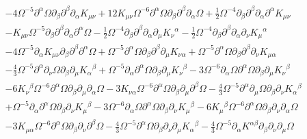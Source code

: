 \documentclass[aps]{revtex4}
\begin{document}
\begin{align}
\nonumber\\
&- 4 \Omega^{-5} \partial^{\alpha}\Omega \partial_{\beta}\partial^{\beta}\partial_{\alpha}K_{\mu \nu} + 12 K_{\mu \nu} \Omega^{-6} \partial^{\alpha}\Omega \partial_{\beta}\partial^{\beta}\partial_{\alpha}\Omega + \tfrac{1}{2} \Omega^{-4} \partial_{\beta}\partial^{\beta}\partial_{\alpha}\partial^{\alpha}K_{\mu \nu}
\nonumber\\
& -  K_{\mu \nu} \Omega^{-5} \partial_{\beta}\partial^{\beta}\partial_{\alpha}\partial^{\alpha}\Omega -  \tfrac{1}{2} \Omega^{-4} \partial_{\beta}\partial^{\beta}\partial_{\alpha}\partial_{\mu}K_{\nu}{}^{\alpha} -  \tfrac{1}{2} \Omega^{-4} \partial_{\beta}\partial^{\beta}\partial_{\alpha}\partial_{\nu}K_{\mu}{}^{\alpha} 
\nonumber\\
&- 4 \Omega^{-5} \partial_{\alpha}K_{\mu \nu} \partial_{\beta}\partial^{\beta}\partial^{\alpha}\Omega + \Omega^{-5} \partial^{\alpha}\Omega \partial_{\beta}\partial^{\beta}\partial_{\mu}K_{\nu \alpha} + \Omega^{-5} \partial^{\alpha}\Omega \partial_{\beta}\partial^{\beta}\partial_{\nu}K_{\mu \alpha} 
\nonumber\\
&-  \tfrac{4}{3} \Omega^{-5} \partial^{\alpha}\partial_{\nu}\Omega \partial_{\beta}\partial_{\mu}K_{\alpha}{}^{\beta} + \Omega^{-5} \partial_{\alpha}\partial^{\alpha}\Omega \partial_{\beta}\partial_{\mu}K_{\nu}{}^{\beta} - 3 \Omega^{-6} \partial_{\alpha}\Omega \partial^{\alpha}\Omega \partial_{\beta}\partial_{\mu}K_{\nu}{}^{\beta} 
\nonumber\\
&- 6 K_{\nu}{}^{\beta} \Omega^{-6} \partial^{\alpha}\Omega \partial_{\beta}\partial_{\mu}\partial_{\alpha}\Omega - 3 K_{\nu \alpha} \Omega^{-6} \partial^{\alpha}\Omega \partial_{\beta}\partial_{\mu}\partial^{\beta}\Omega -  \tfrac{4}{3} \Omega^{-5} \partial^{\alpha}\partial_{\mu}\Omega \partial_{\beta}\partial_{\nu}K_{\alpha}{}^{\beta}
\nonumber\\
& + \Omega^{-5} \partial_{\alpha}\partial^{\alpha}\Omega \partial_{\beta}\partial_{\nu}K_{\mu}{}^{\beta} - 3 \Omega^{-6} \partial_{\alpha}\Omega \partial^{\alpha}\Omega \partial_{\beta}\partial_{\nu}K_{\mu}{}^{\beta} - 6 K_{\mu}{}^{\beta} \Omega^{-6} \partial^{\alpha}\Omega \partial_{\beta}\partial_{\nu}\partial_{\alpha}\Omega 
\nonumber\\
&- 3 K_{\mu \alpha} \Omega^{-6} \partial^{\alpha}\Omega \partial_{\beta}\partial_{\nu}\partial^{\beta}\Omega -  \tfrac{4}{3} \Omega^{-5} \partial^{\alpha}\Omega \partial_{\beta}\partial_{\nu}\partial_{\mu}K_{\alpha}{}^{\beta} -  \tfrac{4}{3} \Omega^{-5} \partial_{\alpha}K^{\alpha \beta} \partial_{\beta}\partial_{\nu}\partial_{\mu}\Omega 

\end{align}
\end{document}
